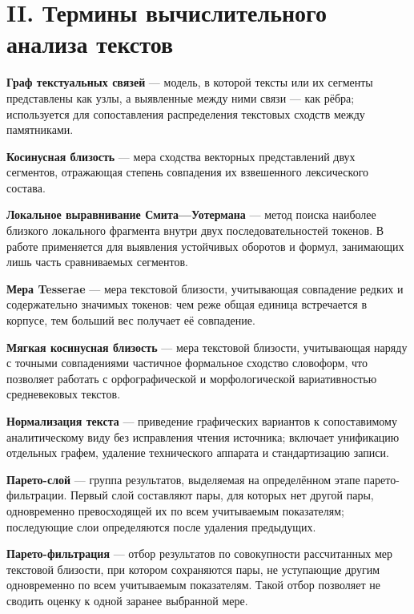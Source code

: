 \section{II. Термины вычислительного анализа текстов}

\noindent\textbf{Граф текстуальных связей} --- модель, в которой тексты или их сегменты представлены как узлы, а выявленные между ними связи --- как рёбра; используется для сопоставления распределения текстовых сходств между памятниками.
\par\medskip

\noindent\textbf{Косинусная близость} --- мера сходства векторных представлений двух сегментов, отражающая степень совпадения их взвешенного лексического состава.
\par\medskip

\noindent\textbf{Локальное выравнивание Смита---Уотермана} --- метод поиска наиболее близкого локального фрагмента внутри двух последовательностей токенов. В работе применяется для выявления устойчивых оборотов и формул, занимающих лишь часть сравниваемых сегментов.
\par\medskip

\noindent\textbf{Мера Tesserae} --- мера текстовой близости, учитывающая совпадение редких и содержательно значимых токенов: чем реже общая единица встречается в корпусе, тем больший вес получает её совпадение.
\par\medskip

\noindent\textbf{Мягкая косинусная близость} --- мера текстовой близости, учитывающая наряду с точными совпадениями частичное формальное сходство словоформ, что позволяет работать с орфографической и морфологической вариативностью средневековых текстов.
\par\medskip

\noindent\textbf{Нормализация текста} --- приведение графических вариантов к сопоставимому аналитическому виду без исправления чтения источника; включает унификацию отдельных графем, удаление технического аппарата и стандартизацию записи.
\par\medskip

\noindent\textbf{Парето-слой} --- группа результатов, выделяемая на определённом этапе парето-фильтрации. Первый слой составляют пары, для которых нет другой пары, одновременно превосходящей их по всем учитываемым показателям; последующие слои определяются после удаления предыдущих.
\par\medskip

\noindent\textbf{Парето-фильтрация} --- отбор результатов по совокупности рассчитанных мер текстовой близости, при котором сохраняются пары, не уступающие другим одновременно по всем учитываемым показателям. Такой отбор позволяет не сводить оценку к одной заранее выбранной мере.
\par\medskip

